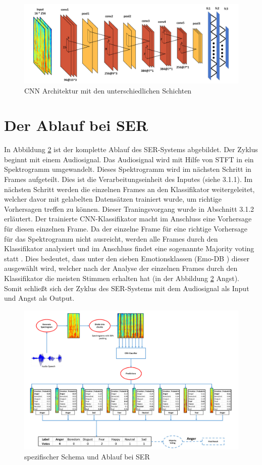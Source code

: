\begin{figure}
    \centering
    \includegraphics[width=1\textwidth]{images/conv}
    \caption{\label{architektur}CNN Architektur mit den unterschiedlichen Schichten \cite{badshah2019deep}}
\end{figure}


\section{Der Ablauf bei SER}
In Abbildung \ref{ablauf} ist der komplette Ablauf des SER-Systems abgebildet. Der Zyklus beginnt mit einem Audiosignal. Das Audiosignal wird mit Hilfe von STFT in ein Spektrogramm umgewandelt. Dieses Spektrogramm wird im nächsten Schritt in Frames aufgeteilt. Dies ist die Verarbeitungseinheit des Inputes (siehe 3.1.1). Im nächsten Schritt werden die einzelnen Frames an den Klassifikator weitergeleitet, welcher davor mit gelabelten Datensätzen trainiert wurde, um richtige Vorhersagen treffen zu können. Dieser Traningsvorgang wurde in Abschnitt 3.1.2 erläutert. Der trainierte CNN-Klassifikator macht im Anschluss eine Vorhersage für diesen einzelnen Frame. Da der einzelne Frame für eine richtige Vorhersage für das Spektrogramm nicht ausreicht, werden alle Frames durch den Klassifikator analysiert und im Anschluss findet eine sogenannte Majority voting statt \cite{badshah2019deep}. Dies bedeutet, dass unter den sieben Emotionsklassen (Emo-DB \cite{burkhardt2005database}) dieser ausgewählt wird, welcher nach der Analyse der einzelnen Frames durch den Klassifikator die meisten Stimmen erhalten hat (in der Abbildung \ref{ablauf} Angst). Somit schließt sich der Zyklus des SER-Systems mit dem Audiosignal als Input und Angst als Output.
\begin{figure}[ht]
	\centering
	\includegraphics[width=1\textwidth]{images/ablauf}
	\caption{\label{ablauf}spezifischer Schema und Ablauf bei SER \cite{badshah2019deep}}
\end{figure}




